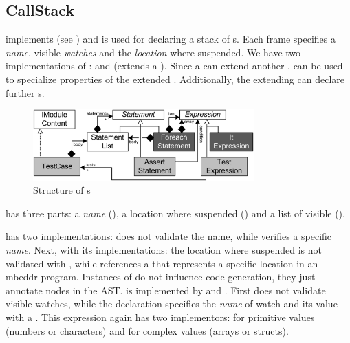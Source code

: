 \subsection{CallStack}

 implements  
(see ) and is used for declaring a
stack of s. Each frame specifies a \emph{name}, 
visible \emph{watches} and the \emph{location} where suspended.
We have two implementations of :
 and  
(extends a ).
Since a  can extend another
,  can be used 
to specialize properties of the extended . Additionally, the
extending  can declare further s.

\begin{figure}[h]
  \vspace{-2mm}
  \centering
    \includegraphics[width=8.5cm]{./figures/umldiag.png} 
    \vspace{-2mm}
    \caption{Structure of s}
  \label{fig:CallStackStructure}
  \vspace{-2mm}
\end{figure}

 has three parts: a \emph{name} 
(), a location where suspended () 
and a list of visible ().

 has two implementations:  does not
validate the name, while  verifies a specific
\emph{name}. Next,  with its implementations:
the location where suspended is not validated with ,
while  references a  that represents a
specific location in an mbeddr program. Instances of  do not influence
code generation, they just annotate nodes in the \ac{AST}.  is
implemented by  and . First does not
validate visible watches, while the declaration specifies the \emph{name} of
watch and its value with a . This expression again has two
implementors:  for primitive values (\eg numbers or
characters) and  for complex values (\eg arrays or
structs).

